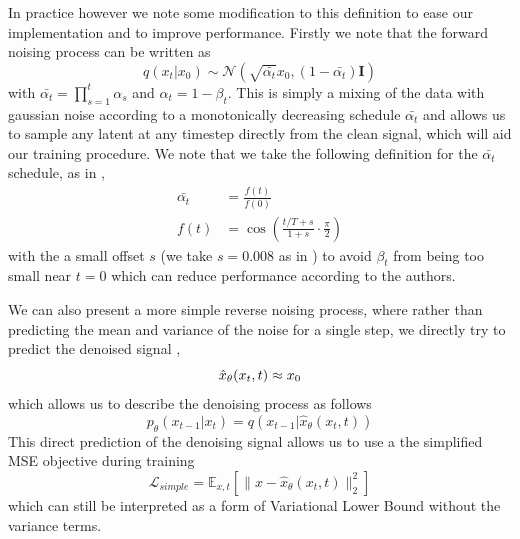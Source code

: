 In practice however we note some modification to this definition to ease our implementation and to improve performance.
Firstly we note that the forward noising process can be written as
\begin{equation}
    \label{eq:direct_noising_latents}
    q(x_t|x_0) \sim \mathcal{N}(\sqrt{\bar{\alpha_t}}x_0, (1-\bar{\alpha_t})\mathbf{I})
\end{equation}
with $\bar{\alpha_t} = \prod_{s=1}^t \alpha_s$ and $\alpha_t = 1 - \beta_t$. This is simply a mixing of the data with gaussian noise according to a monotonically decreasing schedule $\bar{\alpha_t}$ and allows us to sample any latent at any timestep directly from the clean signal, which will aid our training procedure. We note that we take the following definition for the $\bar{\alpha_t}$ schedule, as in \cite{improved_diffusion},
\begin{equation}
    \begin{aligned}
    \bar{\alpha_t} &= \frac{f(t)}{f(0)} \\
    f(t) &= \cos \left( \frac{t/T + s}{1 + s} \cdot \frac{\pi}{2} \right)
    \end{aligned}
\end{equation}
with the a small offset $s$ (we take $s=0.008$ as in \cite{improved_diffusion}) to avoid $\beta_t$ from being too small near $t=0$ which can reduce performance according to the authors.

We can also present a more simple reverse noising process, where rather than predicting the mean and variance of the noise for a single step, we directly try to predict the denoised signal \cite{ramesh2022hierarchical},
\begin{equation}
    \hat{x}_{\theta}(x_t, t) \approx x_0 \\
\end{equation}
which allows us to describe the denoising process as follows
\begin{equation}
    p_{\theta}(x_{t-1} | x_t) = q(x_{t-1} | \hat{x}_{\theta}(x_t, t))
\end{equation}
This direct prediction of the denoising signal allows us to use a the simplified MSE objective \cite{ddpm,ramesh2022hierarchical} during training
\begin{equation}
    \mathcal{L}_{simple} = \mathbb{E}_{x,t}\left[ \| x - \hat{x}_{\theta}(x_t, t) \|_2^2 \right]
\end{equation}
which can still be interpreted as a form of Variational Lower Bound without the variance terms.


